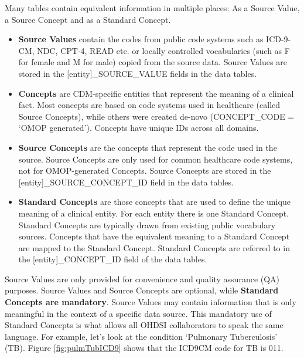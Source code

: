 \documentclass[11pt]{book}
\providecommand{\tightlist}{%
  \setlength{\itemsep}{0pt}\setlength{\parskip}{0pt}}
\begin{document}
Many tables contain equivalent information in multiple places: As a
Source Value, a Source Concept and as a Standard Concept.

\begin{itemize}
\tightlist
\item
  \textbf{Source Values} contain the codes from public code systems such
  as ICD-9-CM, NDC, CPT-4, READ etc. or locally controlled vocabularies
  (such as F for female and M for male) copied from the source data.
  Source Values are stored in the {[}entity{]}\_SOURCE\_VALUE fields in
  the data tables.
\item
  \textbf{Concepts} are CDM-specific entities that represent the meaning
  of a clinical fact. Most concepts are based on code systems used in
  healthcare (called Source Concepts), while others were created de-novo
  (CONCEPT\_CODE = `OMOP generated'). Concepts have unique IDs across
  all domains.
\item
  \textbf{Source Concepts} are the concepts that represent the code used
  in the source. Source Concepts are only used for common healthcare
  code systems, not for OMOP-generated Concepts. Source Concepts are
  stored in the {[}entity{]}\_SOURCE\_CONCEPT\_ID field in the data
  tables.
\item
  \textbf{Standard Concepts} are those concepts that are used to define
  the unique meaning of a clinical entity. For each entity there is one
  Standard Concept. Standard Concepts are typically drawn from existing
  public vocabulary sources. Concepts that have the equivalent meaning
  to a Standard Concept are mapped to the Standard Concept. Standard
  Concepts are referred to in the {[}entity{]}\_CONCEPT\_ID field of the
  data tables.
\end{itemize}

Source Values are only provided for convenience and quality assurance
(QA) purposes. Source Values and Source Concepts are optional, while
\textbf{Standard Concepts are mandatory}. Source Values may contain
information that is only meaningful in the context of a specific data
source. This mandatory use of Standard Concepts is what allows all OHDSI
collaborators to speak the same language. For example, let's look at the
condition `Pulmonary Tuberculosis' (TB). Figure \ref{fig:pulmTubICD9}
shows that the ICD9CM code for TB is 011.
\end{document}
